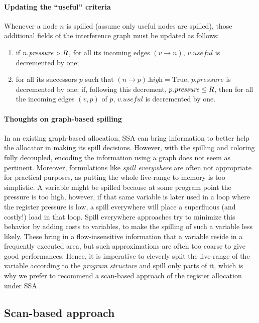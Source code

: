 {\paragraph{Updating the ``useful'' criteria}


Whenever a node $n$ is spilled (assume only useful nodes are spilled), those additional fields of the interference graph must be updated as follows:
\begin{enumerate}
  \item if $n.\textit{pressure}>R$, for all its incoming edges $(v\to n)$, $v.\textit{useful}$ is decremented by one;
  \item for all its successors $p$ such that $(n\to p).\textit{high} = \textrm{True}$, $p.\textit{pressure}$ is decremented by one; if, following this decrement, $p.\textit{pressure} \leq R$, then for all the incoming edges $(v,p)$ of $p$, $v.\textit{useful}$ is decremented by one.
\end{enumerate}


\paragraph{Thoughts on graph-based spilling}

In an existing graph-based allocation, SSA can bring information to better help the allocator in making its spill decisions.
However, with the spilling and coloring fully decoupled, encoding the information using a graph does not seem as pertinent.
Moreover, formulations like \emph{spill everywhere} are often not appropriate for practical purposes, as putting the whole live-range to memory is too simplistic. 
A variable might be spilled because at some program point the pressure is too high, however, if that same variable is later used in a loop where the register pressure is low, a spill everywhere will place a superfluous (and costly!) load in that loop. 
Spill everywhere approaches try to minimize this behavior by adding costs to variables, to make the spilling of such a variable less likely.
These bring in a flow-insensitive information that a variable reside in a frequently executed area, but such approximations are often too coarse to give good performances.
Hence, it is imperative to cleverly split the live-range of the variable according to the \emph{program structure} and spill only parts of it, which is why we prefer to recommend a scan-based approach of the register allocation under SSA.


\subsection{Scan-based approach}%
\label{sec:ra:spill-scan}


}
